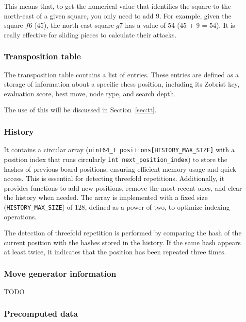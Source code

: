 \noindent This means that, to get the numerical value that identifies the square to the north-east of a given square, you only need to add 9. For example, given the square $f6$ (45), the north-east square $g7$ has a value of 54 (45 + 9 = 54). It is really effective for sliding pieces to calculate their attacks.

\subsubsection{Transposition table}

The transposition table contains a list of entries. These entries are defined as a storage of information about a specific chess position, including its Zobrist key, evaluation score, best move, node type, and search depth.

\vspace{1em}

\noindent The use of this will be discussed in Section~\ref{sec:tt}.

\subsubsection{History}

It contains a circular array (\texttt{uint64\_t positions[HISTORY\_MAX\_SIZE]} with a position index that runs circularly \texttt{int next\_position\_index}) to store the hashes of previous board positions, ensuring efficient memory usage and quick access. This is essential for detecting threefold repetitions. Additionally, it provides functions to add new positions, remove the most recent ones, and clear the history when needed. The array is implemented with a fixed size (\texttt{HISTORY\_MAX\_SIZE}) of \(128\), defined as a power of two, to optimize indexing operations.

\vspace{1em}

\noindent The detection of threefold repetition is performed by comparing the hash of the current position with the hashes stored in the history. If the same hash appears at least twice, it indicates that the position has been repeated three times.

\subsubsection{Move generator information}

TODO

\subsubsection{Precomputed data}

